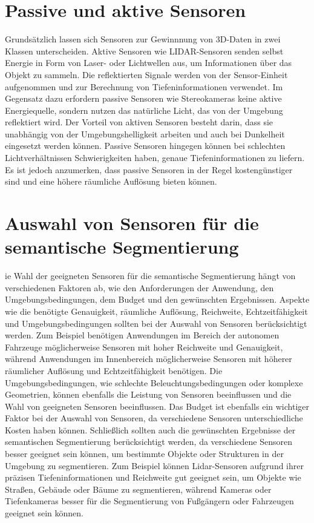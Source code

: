\section{Passive und aktive Sensoren}
Grundsätzlich lassen sich Sensoren zur Gewinnnung von 3D-Daten in zwei Klassen
unterscheiden. Aktive Sensoren wie LIDAR-Sensoren senden selbst Energie in Form
von Laser- oder Lichtwellen aus, um Informationen über das Objekt zu sammeln.
Die reflektierten Signale werden von der Sensor-Einheit aufgenommen und zur
Berechnung von Tiefeninformationen verwendet. Im Gegensatz dazu erfordern
passive Sensoren wie Stereokameras keine aktive Energiequelle, sondern nutzen
das natürliche Licht, das von der Umgebung reflektiert wird. Der Vorteil von
aktiven Sensoren besteht darin, dass sie unabhängig von der Umgebungshelligkeit
arbeiten und auch bei Dunkelheit eingesetzt werden können. Passive Sensoren
hingegen können bei schlechten Lichtverhältnissen Schwierigkeiten haben, genaue
Tiefeninformationen zu liefern. Es ist jedoch anzumerken, dass passive Sensoren
in der Regel kostengünstiger sind und eine höhere räumliche Auflösung bieten
können.

\section{Auswahl von Sensoren für die semantische Segmentierung}
ie Wahl der geeigneten Sensoren für die semantische Segmentierung hängt von
verschiedenen Faktoren ab, wie den Anforderungen der Anwendung, den
Umgebungsbedingungen, dem Budget und den gewünschten Ergebnissen. Aspekte wie
die benötigte Genauigkeit, räumliche Auflösung, Reichweite, Echtzeitfähigkeit
und Umgebungsbedingungen sollten bei der Auswahl von Sensoren berücksichtigt
werden. Zum Beispiel benötigen Anwendungen im Bereich der autonomen Fahrzeuge
möglicherweise Sensoren mit hoher Reichweite und Genauigkeit, während
Anwendungen im Innenbereich möglicherweise Sensoren mit höherer räumlicher
Auflösung und Echtzeitfähigkeit benötigen. Die Umgebungsbedingungen, wie
schlechte Beleuchtungsbedingungen oder komplexe Geometrien, können ebenfalls
die Leistung von Sensoren beeinflussen und die Wahl von geeigneten Sensoren
beeinflussen. Das Budget ist ebenfalls ein wichtiger Faktor bei der Auswahl von
Sensoren, da verschiedene Sensoren unterschiedliche Kosten haben können.
Schließlich sollten auch die gewünschten Ergebnisse der semantischen
Segmentierung berücksichtigt werden, da verschiedene Sensoren besser geeignet
sein können, um bestimmte Objekte oder Strukturen in der Umgebung zu
segmentieren. Zum Beispiel können Lidar-Sensoren aufgrund ihrer präzisen
Tiefeninformationen und Reichweite gut geeignet sein, um Objekte wie Straßen,
Gebäude oder Bäume zu segmentieren, während Kameras oder Tiefenkameras besser
für die Segmentierung von Fußgängern oder Fahrzeugen geeignet sein können.